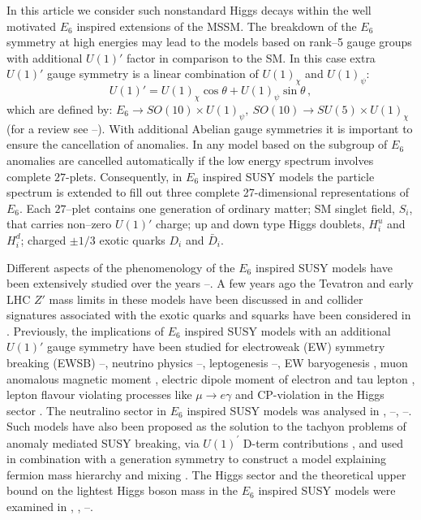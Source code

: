 \documentclass[12pt,a4paper]{article}
\newcommand{\be}{\begin{equation}}
\newcommand{\ee}{\end{equation}}
\begin{document}
In this article we consider such nonstandard Higgs decays within the
well motivated $E_6$ inspired extensions of the MSSM. The breakdown of
the $E_6$ symmetry at high energies may lead to the models based on
rank--5 gauge groups with additional $U(1)'$ factor in comparison to
the SM. In this case extra $U(1)'$ gauge symmetry is a linear
combination of $U(1)_{\chi}$ and $U(1)_{\psi}$: \be
U(1)'=U(1)_{\chi}\cos\theta+U(1)_{\psi}\sin\theta\,,
\label{hd4}
\ee
which are defined by: $E_6\to SO(10)\times U(1)_{\psi},~SO(10)\to SU(5)\times U(1)_{\chi}$
(for a review see \cite{Langacker:2008yv}--\cite{E6-review}).  With additional Abelian gauge
symmetries it is important to ensure the cancellation of anomalies. In any model based on the
subgroup of $E_6$ anomalies are cancelled automatically if the low energy spectrum involves
complete $27$-plets. Consequently, in $E_6$ inspired SUSY models the particle spectrum is
extended to fill out three complete 27-dimensional representations of $E_6$. Each $27$--plet
contains one generation of ordinary matter; SM singlet field, $S_i$, that carries non--zero $U(1)'$
charge; up and down type Higgs doublets, $H^{u}_{i}$ and $H^{d}_{i}$; charged
$\pm 1/3$ exotic quarks $D_i$ and $\bar{D}_i$.

Different aspects of the phenomenology of the $E_6$ inspired SUSY models have been
extensively studied over the years \cite{E6-review}--\cite{E6}. A few years ago the Tevatron
and early LHC $Z'$ mass limits in these models have been discussed in \cite{Accomando:2010fz}
and collider signatures associated with the exotic quarks and squarks have been considered
in \cite{Kang:2007ib}. Previously, the implications of $E_6$ inspired SUSY models with an
additional $U(1)'$ gauge symmetry have been studied for electroweak (EW) symmetry breaking
(EWSB) \cite{Langacker:1998tc}--\cite{Daikoku:2000ep}, neutrino physics \cite{Kang:2004ix}--\cite{Ma:1995xk},
leptogenesis \cite{Hambye:2000bn}--\cite{King:2008qb},
EW baryogenesis \cite{baryogen}, muon anomalous magnetic moment \cite{g-2}, electric
dipole moment of electron \cite{Suematsu:1997tv} and tau lepton \cite{GutierrezRodriguez:2006hb},
lepton flavour violating processes like $\mu\to e\gamma$ \cite{Suematsu:1997qt} and CP-violation in the
Higgs sector \cite{Ham:2008fx}. The neutralino sector in $E_6$ inspired SUSY models was analysed
in \cite{Keith:1997zb}, \cite{Suematsu:1997tv}--\cite{Suematsu:1997qt},
\cite{Suematsu:1997au}--\cite{E6neutralino-higgs}.  Such models have also been proposed as
the solution to the tachyon problems of anomaly mediated SUSY breaking, via $U(1)^\prime$ D-term
contributions \cite{Asano:2008ju}, and used in combination with a generation symmetry to construct
a model explaining fermion mass hierarchy and mixing \cite{Stech:2008wd}. The Higgs sector and
the theoretical upper bound on the lightest Higgs boson mass in the $E_6$ inspired SUSY models
were examined in \cite{Daikoku:2000ep}, \cite{E6neutralino-higgs}, \cite{King:2005jy}--\cite{E6-higgs}.
\end{document}
